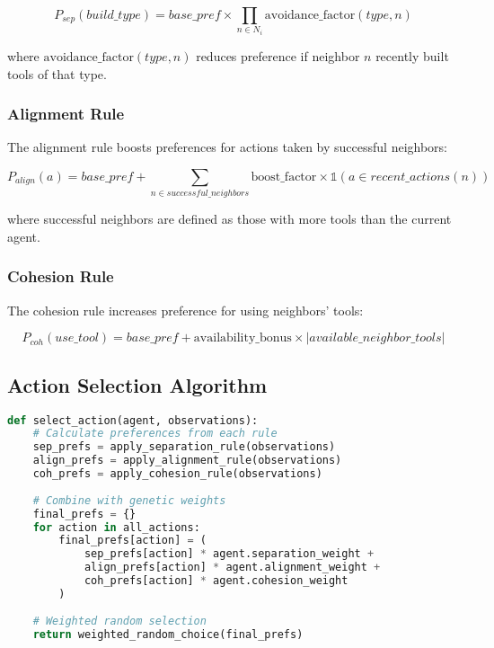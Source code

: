 \documentclass[10pt]{article}
\begin{document}
\begin{equation}
P_{sep}(build\_type) = base\_pref \times \prod_{n \in N_i} \text{avoidance\_factor}(type, n)
\end{equation}

where $\text{avoidance\_factor}(type, n)$ reduces preference if neighbor $n$ recently built tools of that type.

\subsubsection{Alignment Rule}
The alignment rule boosts preferences for actions taken by successful neighbors:

\begin{equation}
P_{align}(a) = base\_pref + \sum_{n \in successful\_neighbors} \text{boost\_factor} \times \mathbb{1}(a \in recent\_actions(n))
\end{equation}

where successful neighbors are defined as those with more tools than the current agent.

\subsubsection{Cohesion Rule}
The cohesion rule increases preference for using neighbors' tools:

\begin{equation}
P_{coh}(use\_tool) = base\_pref + \text{availability\_bonus} \times |available\_neighbor\_tools|
\end{equation}

\subsection{Action Selection Algorithm}

\begin{lstlisting}[language=Python, caption=Action Selection Pseudocode]
def select_action(agent, observations):
    # Calculate preferences from each rule
    sep_prefs = apply_separation_rule(observations)
    align_prefs = apply_alignment_rule(observations)
    coh_prefs = apply_cohesion_rule(observations)
    
    # Combine with genetic weights
    final_prefs = {}
    for action in all_actions:
        final_prefs[action] = (
            sep_prefs[action] * agent.separation_weight +
            align_prefs[action] * agent.alignment_weight +
            coh_prefs[action] * agent.cohesion_weight
        )
    
    # Weighted random selection
    return weighted_random_choice(final_prefs)
\end{lstlisting}
\end{document}
